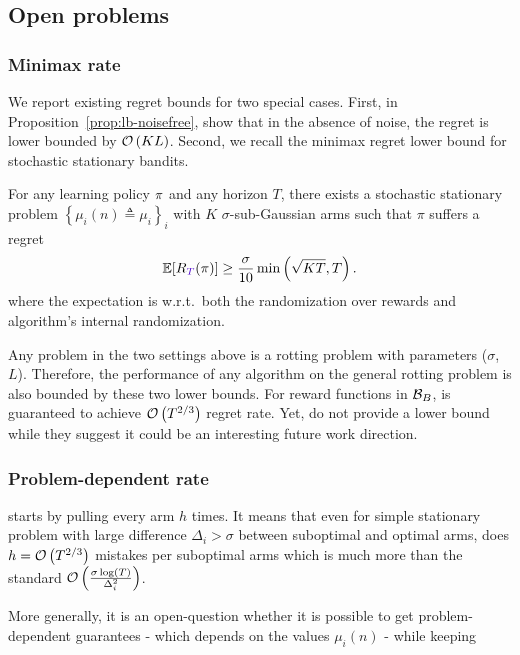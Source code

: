 \subsection{Open problems}

\subsubsection{Minimax rate}
We report existing regret bounds for two special cases. First, in Proposition~\ref{prop:lb-noisefree}, \citet{heidari2016tight} show that in the absence of noise, the regret is lower bounded by $\mathcal{O}\left(KL\right)$. Second, we recall the minimax regret lower bound for stochastic stationary bandits.

\begin{proposition}{\cite[Thm.\,5.1]{auer2002nonstochastic}}
\label{stochastic-LB}
For any learning policy $\pi$ and any horizon $T$, there exists a stochastic stationary problem $\left\{ \mu_i (n) \triangleq \mu_i\right\}_i$ with $K$ $\sigma$-sub-Gaussian arms such that $\pi$ suffers a regret
\begin{equation*}
 \mathbb{E}[\regret(\policy)] \geq \frac{\sigma}{10}\min\pa{\sqrt{\narms\timeEnd},\timeEnd}.
\end{equation*}
where the expectation is w.r.t.\ both the randomization
over rewards and algorithm's internal randomization.
\end{proposition}

Any problem in the two settings above is a rotting problem with parameters ($\sigma$, $L$). Therefore, the performance of any algorithm on the general rotting problem is also bounded by these two lower bounds. For reward functions in $\mathcal{B}_{B}$, \SWA is guaranteed to achieve $\mathcal{O}\left(T^{2/3}\right)$ regret rate. Yet, \citet{levine2017rotting} do not provide a lower bound while they suggest it could be an interesting future work direction.

\subsubsection{Problem-dependent rate}
\SWA starts by pulling every arm $h$ times. It means that even for simple stationary problem with large difference $\Delta_i > \sigma$ between suboptimal and optimal arms, \SWA does $h = \mathcal{O}\left(T^{2/3}\right)$ mistakes per suboptimal arms which is much more than the standard $\mathcal{O}\left(\frac{\sigma\log\left(T\right)}{\Delta_i^2}\right)$.

More generally, it is an open-question whether it is possible to get problem-dependent guarantees - which depends on the values $\mu_i(n)$ - while keeping 


